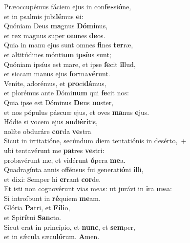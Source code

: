 \evenverse Præoccupémus fáciem ejus in con\textbf{fes}si\textbf{ó}ne,~\*\\
\evenverse et in psalmis jubi\textbf{lé}mus \textbf{e}i:\\
\oddverse Quóniam Deus \textbf{ma}gnus \textbf{Dó}\textbf{mi}nus,~\*\\
\oddverse et rex magnus super \textbf{om}nes \textbf{de}os.\\
\evenverse Quia in manu ejus sunt omnes \textbf{fi}nes \textbf{ter}ræ,~\*\\
\evenverse et altitúdines mónti\textbf{um} i\textbf{psí}us sunt;\\
\oddverse Quóniam ipsíus est mare, et ipse \textbf{fe}cit \textbf{il}lud,~\*\\
\oddverse et siccam manus ejus \textbf{for}ma\textbf{vé}runt.\\
\evenverse Veníte, adorémus, et \textbf{pro}ci\textbf{dá}mus,~\*\\
\evenverse et plorémus ante Dómi\textbf{num} qui \textbf{fe}cit nos:\\
\oddverse Quia ipse est Dóminus \textbf{De}us \textbf{no}ster,~\*\\
\oddverse et nos pópulus páscuæ ejus, et oves \textbf{ma}nus \textbf{e}jus.\\
\evenverse Hódie si vocem ejus \textbf{au}di\textbf{é}\textbf{ri}tis,~\*\\
\evenverse nolíte obduráre \textbf{cor}da \textbf{ve}stra\\
\oddverse Sicut in irritatióne, secúndum diem tentatiónis in desérto,~+\\
\oddverse  ubi tentavérunt me \textbf{pa}tres \textbf{ve}stri:~\*\\
\oddverse probavérunt me, et vidérunt \textbf{ó}pera \textbf{me}a.\\
\evenverse Quadragínta annis offénsus fui generati\textbf{ó}ni \textbf{il}li,~\*\\
\evenverse et dixi: Semper hi \textbf{er}rant \textbf{cor}de.\\
\oddverse Et isti non cognovérunt vias meas: ut jurávi in \textbf{i}ra \textbf{me}a:~\*\\
\oddverse Si introíbunt in \textbf{ré}quiem \textbf{me}am.\\
\evenverse Glória \textbf{Pa}tri, et \textbf{Fí}\textbf{li}o,~\*\\
\evenverse et Spi\textbf{rí}tui \textbf{San}cto.\\
\oddverse Sicut erat in princípio, et \textbf{nunc}, et \textbf{sem}per,~\*\\
\oddverse et in sǽcula sæcu\textbf{ló}rum. \textbf{A}men.\\
